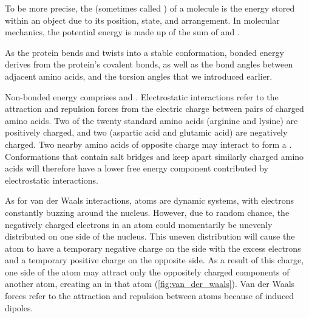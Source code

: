 To be more precise, the  (sometimes called ) of a molecule is the energy stored within an object due to its position, state, and arrangement. In molecular mechanics, the potential energy is made up of the sum of  and .

As the protein bends and twists into a stable conformation, bonded energy derives from the protein's covalent bonds, as well as the bond angles between adjacent amino acids, and the torsion angles that we introduced earlier.

Non-bonded energy comprises  and . Electrostatic interactions refer to the attraction and repulsion forces from the electric charge between pairs of charged amino acids. Two of the twenty standard amino acids (arginine and lysine) are positively charged, and two (aspartic acid and glutamic acid) are negatively charged. Two nearby amino acids of opposite charge may interact to form a . Conformations that contain salt bridges and keep apart similarly charged amino acids will therefore have a lower free energy component contributed by electrostatic interactions.

As for van der Waals interactions, atoms are dynamic systems, with electrons constantly buzzing around the nucleus. However, due to random chance, the negatively charged electrons in an atom could momentarily be unevenly distributed on one side of the nucleus. This uneven distribution will cause the atom to have a temporary negative charge on the side with the excess electrons and a temporary positive charge on the opposite side. As a result of this charge, one side of the atom may attract only the oppositely charged components of another atom, creating an  in that atom (\autoref{fig:van_der_waals}). Van der Waals forces refer to the attraction and repulsion between atoms because of induced dipoles.

